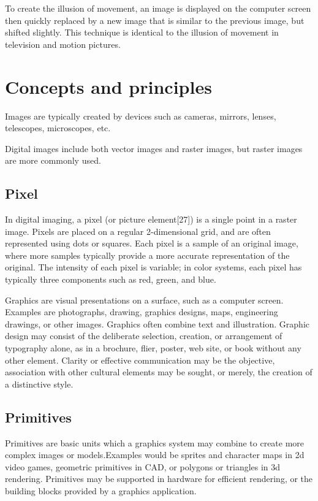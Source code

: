 \documentclass[a4paper]{article}
\begin{document}
To create the illusion of movement, an image is displayed on the computer screen then quickly replaced by a new image that is similar to the previous image, but shifted slightly. This technique is identical to the illusion of movement in television and motion pictures.
   \newpage
 \section{Concepts and principles}
Images are typically created by devices such as cameras, mirrors, lenses, telescopes, microscopes, etc.

Digital images include both vector images and raster images, but raster images are more commonly used.
  \subsection{Pixel}
  In digital imaging, a pixel (or picture element[27]) is a single point in a raster image. Pixels are placed on a regular 2-dimensional grid, and are often represented using dots or squares. Each pixel is a sample of an original image, where more samples typically provide a more accurate representation of the original. The intensity of each pixel is variable; in color systems, each pixel has typically three components such as red, green, and blue.

Graphics are visual presentations on a surface, such as a computer screen. Examples are photographs, drawing, graphics designs, maps, engineering drawings, or other images. Graphics often combine text and illustration. Graphic design may consist of the deliberate selection, creation, or arrangement of typography alone, as in a brochure, flier, poster, web site, or book without any other element. Clarity or effective communication may be the objective, association with other cultural elements may be sought, or merely, the creation of a distinctive style.
\subsection{Primitives}

Primitives are basic units which a graphics system may combine to create more complex images or models.Examples would be sprites and character maps in 2d video games, geometric primitives in CAD, or polygons or triangles in 3d rendering. Primitives may be supported in hardware for efficient rendering, or the building blocks provided by a graphics application.
\end{document}
